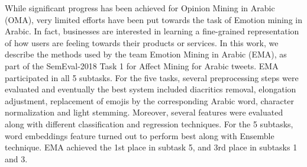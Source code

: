 While significant progress has been achieved for Opinion Mining in Arabic (OMA), very limited efforts have been put towards the task of Emotion mining in Arabic. In fact, businesses are interested in learning a fine-grained representation of how users are feeling towards their products or services. In this work, we describe the methods used by the team Emotion Mining in Arabic (EMA), as part of the SemEval-2018 Task 1 for Affect Mining for Arabic tweets. EMA participated in all 5 subtasks. For the five tasks, several preprocessing steps were evaluated and eventually the best system included diacritics removal, elongation adjustment, replacement of emojis by the corresponding Arabic word, character normalization and light stemming. Moreover, several features were evaluated along with different classification and regression techniques. For the 5 subtasks, word embeddings feature turned out to perform best along with Ensemble technique. EMA achieved the 1st place in subtask 5, and 3rd place in subtasks 1 and 3.
